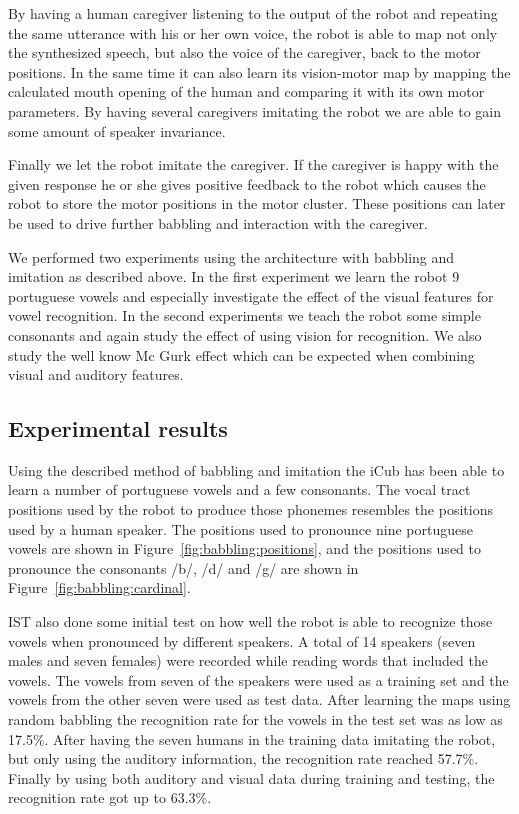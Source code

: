 By having a human caregiver listening to the output of the robot and
repeating the same utterance with his or her own voice, the robot is
able to map not only the synthesized speech, but also the voice of the
caregiver, back to the motor positions. In the same time it can also
learn its vision-motor map by mapping the calculated mouth opening of
the human and comparing it with its own motor parameters. By having
several caregivers imitating the robot we are able to gain some
amount of speaker invariance.

Finally we let the robot imitate the caregiver. If the caregiver is
happy with the given response he or she gives positive feedback to the
robot which causes the robot to store the motor positions in the motor
cluster. These positions can later be used to drive further babbling
and interaction with the caregiver.

We performed two experiments using the architecture with babbling and
imitation as described above. In the first experiment we learn the
robot 9 portuguese vowels and especially investigate the effect of the
visual features for vowel recognition. In the second experiments we
teach the robot some simple consonants and again study the effect of
using vision for recognition. We also study the well know Mc Gurk
effect which can be expected when combining visual and auditory
features.

\subsection{Experimental results}
Using the described method of babbling and imitation the iCub has been
able to learn a number of portuguese vowels and a few consonants. The
vocal tract positions used by the robot to produce those phonemes
resembles the positions used by a human speaker. The positions used to
pronounce nine portuguese vowels are shown in Figure~\ref{fig:babbling:positions}, and the
positions used to pronounce the consonants /b/, /d/ and /g/ are shown
in Figure~\ref{fig:babbling:cardinal}.

IST also done some initial test on how well the robot is able to
recognize those vowels when pronounced by different speakers. A total
of 14 speakers (seven males and seven females) were recorded while
reading words that included the vowels. The vowels from seven of the
speakers were used as a training set and the vowels from the other
seven were used as test data. After learning the maps using random
babbling the recognition rate for the vowels in the test set was as
low as 17.5\%. After having the seven humans in the training data
imitating the robot, but only using the auditory information, the
recognition rate reached 57.7\%. Finally by using both auditory and
visual data during training and testing, the recognition rate got up
to 63.3\%.

